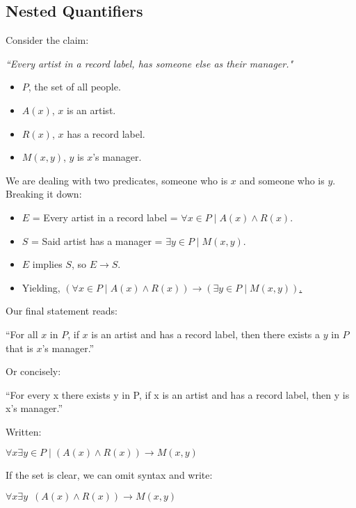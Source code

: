 \subsection{Nested Quantifiers}

\noindent
Consider the claim:

\begin{center}
    \Large
    \textit{``Every artist in a record label, has someone else as their manager."}
\end{center}

\begin{itemize}
    \item $P$, the set of all people.
    \item $A(x)$, $x$ is an artist.
    \item $R(x)$, $x$ has a record label.
    \item $M(x, y)$, $y$ is $x$'s manager.
\end{itemize}

\noindent
We are dealing with two predicates, someone who is $x$ and someone who is $y$. Breaking it down:
\begin{itemize}
    \item $E$ = Every artist in a record label = $\forall x \in P \mid A(x) \land R(x)$.
    \item $S$ = Said artist has a manager =  $\exists y \in P \mid M(x, y)$.
    \item $E$ implies $S$, so $E \rightarrow S$.
    \item Yielding, \underline{$(\forall x \in P \mid A(x) \land R(x)) \rightarrow (\exists y \in P \mid M(x, y))$.}
\end{itemize}

\noindent
Our final statement reads:

\begin{center}
    \Large
    ``For all $x$ in $P$, if $x$ is an artist and has a record label, then there exists a $y$ in $P$ that is $x$'s manager.''
\end{center}

\noindent
Or concisely:\\

\begin{center}
    \Large
    ``For every x there exists y in P, if x is an artist and has a record label, then y is x's manager.''
\end{center}

\noindent
Written:\\

\begin{center}
    \Large
    $\forall x \exists y \in P \mid (A(x)\land R(x)) \rightarrow M(x,y)$
\end{center}

\noindent
If the set is clear, we can omit syntax and write:\\

\begin{center}
    \Large
    $\forall x \exists y \enspace (A(x)\land R(x)) \rightarrow M(x,y)$
\end{center}
